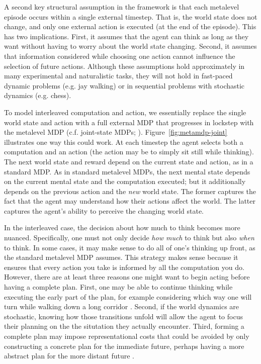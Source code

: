 A second key structural assumption in the framework is that each metalevel episode occurs within a single external timestep. That is, the world state does not change, and only one external action is executed (at the end of the episode). This has two implications. First, it assumes that the agent can think as long as they want without having to worry about the world state changing. Second, it assumes that information considered while choosing one action cannot influence the selection of future actions. Although these assumptions hold approximately in many experimental and naturalistic tasks, they will not hold in fast-paced dynamic problems (e.g. jay walking) or in sequential problems with stochastic dynamics (e.g. chess).

To model interleaved computation and action, we essentially replace the single world state and action with a full external MDP that progresses in lockstep with the metalevel MDP (c.f. joint-state MDPs; \citealp{russell1991right,parr1998reinforcement,hay2016principles}). Figure~\ref{fig:metamdp-joint} illustrates one way this could work. At each timestep the agent selects both a computation and an action (the action may be to simply sit still while thinking). The next world state and reward depend on the current state and action, as in a standard MDP. As in standard metalevel MDPs, the next mental state depends on the current mental state and the computation executed; but it additionally depends on the previous action and the \emph{new} world state. The former captures the fact that the agent may understand how their actions affect the world. The latter captures the agent's ability to perceive the changing world state.

In the interleaved case, the decision about how much to think becomes more nuanced. Specifically, one must not only decide \emph{how much} to think but also \emph{when} to think. In some cases, it may make sense to do all of one's thinking up front, as the standard metalevel MDP assumes. This strategy makes sense because it ensures that every action you take is informed by all the computation you do. However, there are at least three reasons one might want to begin acting before having a complete plan. First, one may be able to continue thinking while executing the early part of the plan, for example considering which way one will turn while walking down a long corridor \citep{oceallaigh2015metareasoning}. Second, if the world dynamics are stochastic, knowing how those transitions unfold will allow the agent to focus their planning on the the situtation they actually encounter. Third, forming a complete plan may impose representational costs that could be avoided by only constructing a concrete plan for the immediate future, perhaps having a more abstract plan for the more distant future \citep{ho2020efficiency}.


